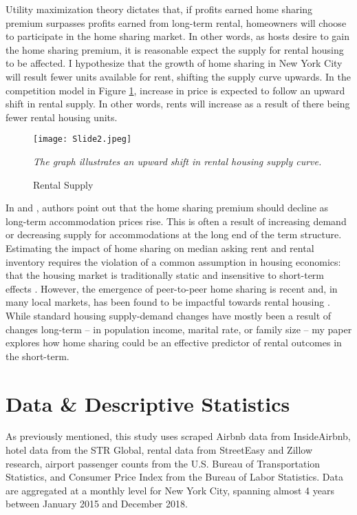 \documentclass[12pt]{article}
\begin{document}
		\par
		Utility maximization theory dictates that, if profits earned home sharing premium surpasses profits earned from long-term rental, homeowners will choose to participate in the home sharing market. In other words, as hosts desire to gain the home sharing premium, it is reasonable expect the supply for rental housing to be affected. I hypothesize that the growth of home sharing in New York City will result fewer units available for rent, shifting the supply curve upwards. In the competition model in Figure \ref{fig:RentalSupply}, increase in price is expected to follow an upward shift in rental supply. In other words, rents will increase as a result of there being fewer rental housing units.
		
		\begin{figure}[!htbp] %
			\begin{center}
				\caption{Rental Supply} %
				\label{fig:RentalSupply}
				\texttt{[image: Slide2.jpeg]}
			\end{center}
			\emph{The graph illustrates an upward shift in rental housing supply curve.}
		\end{figure}
		
		\par
		In \citet{coles2017airbnb} and \citet{horn2017home}, authors point out that the home sharing premium should decline as long-term accommodation prices rise. This is often a result of increasing demand or decreasing supply for accommodations at the long end of the term structure. Estimating the impact of home sharing on median asking rent and rental inventory requires the violation of a common assumption in housing economics: that the housing market is traditionally static and insensitive to short-term effects \citep{blank1953structure}. However, the emergence of peer-to-peer home sharing is recent and, in many local markets, has been found to be impactful towards rental housing \citep{ayouba2019does, horn2017home}. While standard housing supply-demand changes have mostly been a result of changes long-term -- in population income, marital rate, or family size -- my paper explores how home sharing could be an effective predictor of rental outcomes in the short-term.
		
	\section{Data \& Descriptive Statistics} %
		As previously mentioned, this study uses scraped Airbnb data from InsideAirbnb, hotel data from the STR Global, rental data from StreetEasy and Zillow research, airport passenger counts from the U.S. Bureau of Transportation Statistics, and Consumer Price Index from the Bureau of Labor Statistics. Data are aggregated at a monthly level for New York City, spanning almost 4 years between January 2015 and December 2018. 
		
\end{document}
